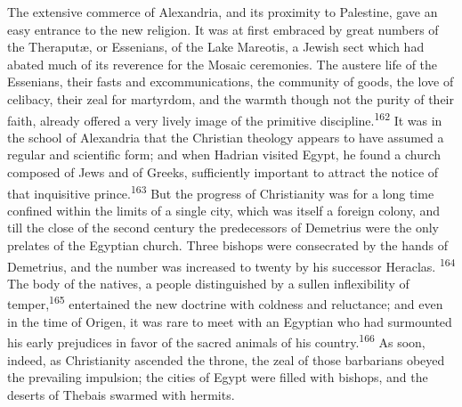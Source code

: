 The extensive commerce of Alexandria, and its proximity to
Palestine, gave an easy entrance to the new religion. It was at
first embraced by great numbers of the Theraputæ, or Essenians,
of the Lake Mareotis, a Jewish sect which had abated much of its
reverence for the Mosaic ceremonies. The austere life of the
Essenians, their fasts and excommunications, the community of
goods, the love of celibacy, their zeal for martyrdom, and the
warmth though not the purity of their faith, already offered a
very lively image of the primitive discipline.\textsuperscript{162} It was in the
school of Alexandria that the Christian theology appears to have
assumed a regular and scientific form; and when Hadrian visited
Egypt, he found a church composed of Jews and of Greeks,
sufficiently important to attract the notice of that inquisitive
prince.\textsuperscript{163} But the progress of Christianity was for a long time
confined within the limits of a single city, which was itself a
foreign colony, and till the close of the second century the
predecessors of Demetrius were the only prelates of the Egyptian
church. Three bishops were consecrated by the hands of Demetrius,
and the number was increased to twenty by his successor Heraclas. \textsuperscript{164}
The body of the natives, a people distinguished by a sullen
inflexibility of temper,\textsuperscript{165} entertained the new doctrine with
coldness and reluctance; and even in the time of Origen, it was
rare to meet with an Egyptian who had surmounted his early
prejudices in favor of the sacred animals of his country.\textsuperscript{166} As
soon, indeed, as Christianity ascended the throne, the zeal of
those barbarians obeyed the prevailing impulsion; the cities of
Egypt were filled with bishops, and the deserts of Thebais
swarmed with hermits.




